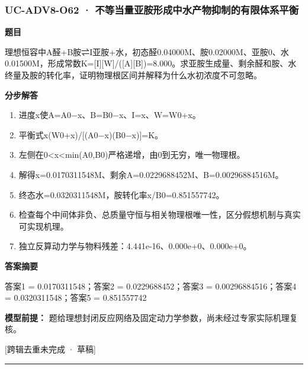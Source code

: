 \documentclass[UTF8,11pt,a4paper]{ctexart}
\begin{document}
\subsubsection*{UC-ADV8-O62 · 不等当量亚胺形成中水产物抑制的有限体系平衡}
\noindent\textbf{题目}\par
理想恒容中A醛+B胺⇌I亚胺+水，初态醛0.04000M、胺0.02000M、亚胺0、水0.01500M，形成常数K=[I][W]/([A][B])=8.000。求亚胺生成量、剩余醛和胺、水终量及胺的转化率，证明物理根区间并解释为什么水初浓度不可忽略。\par
\medskip\noindent\textbf{分步解答}
\begin{enumerate}
\item 进度x使A=A0−x、B=B0−x、I=x、W=W0+x。
\item 平衡式x(W0+x)/[(A0−x)(B0−x)]=K。
\item 左侧在0<x<min(A0,B0)严格递增，由0到无穷，唯一物理根。
\item 解得x=0.0170311548M、剩余A=0.0229688452M、B=0.00296884516M。
\item 终态水=0.0320311548M，胺转化率x/B0=0.851557742。
\item 检查每个中间体非负、总质量守恒与相关物理根唯一性，区分假想机制与真实可实现机理。
\item 独立反算动力学与物料残差：4.441e-16、0.000e+0、0.000e+0。
\end{enumerate}
\noindent\textbf{答案摘要}\par
答案1 = 0.0170311548；答案2 = 0.0229688452；答案3 = 0.00296884516；答案4 = 0.0320311548；答案5 = 0.851557742\par
\noindent\textbf{模型前提：}
题给理想封闭反应网络及固定动力学参数，尚未经过专家实际机理复核。\par
\noindent\textcolor{red!65!black}{[跨辑去重未完成 · 草稿]} \par
\medskip\hrule\medskip
{}
\end{document}
